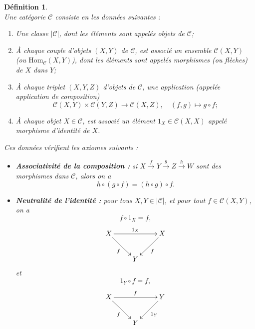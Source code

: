 \documentclass[a4paper, 14pt]{report}
\newtheorem{definition}{Définition}[section]
\begin{document}
\begin{onehalfspace}
{			\begin{definition} \cite{maclane1971categories} \\
				Une catégorie $\mathcal{C}$ consiste en les données suivantes :
				\begin{enumerate} [label=\roman*)]
					\item Une classe $|\mathcal{C}|$, dont les éléments sont appelés objets de $\mathcal{C}$;
					\item À chaque couple d'objets $(X, Y)$ de $\mathcal{C}$, est associé un ensemble $\mathcal{C}(X, Y)$ (ou $\mathrm{Hom}_{\mathcal{C}}(X, Y)$), dont les éléments sont appelés morphismes (ou flèches) de $X$ dans $Y$;
					\item À chaque triplet $(X, Y, Z)$ d'objets de $\mathcal{C}$, une application (appelée application de composition)
					\[
					\mathcal{C}(X, Y) \times \mathcal{C}(Y, Z) \to \mathcal{C}(X, Z), \quad (f, g) \mapsto g \circ f;
					\]
					\item À chaque objet $X \in \mathcal{C}$, est associé un élément $1_X \in \mathcal{C}(X, X)$ appelé morphisme d'identité de $X$.
				\end{enumerate}
				Ces données vérifient les axiomes suivants :
				\begin{itemize}
					\item \textbf{Associativité de la composition :}
					si $X \xrightarrow{f} Y \xrightarrow{g} Z \xrightarrow{h} W$ sont des morphismes dans $\mathcal{C}$, alors on a
					\[
					h \circ (g \circ f) = (h \circ g) \circ f.
					\]
					\item \textbf{Neutralité de l'identité :}
					pour tous $X, Y \in |\mathcal{C}|$, et pour tout $f \in \mathcal{C}(X, Y)$, on a
					\[
					f \circ 1_{X} = f,
					\]
					\[
					\xymatrix{
						X \ar[rr]^{1_{X}} \ar[dr]_{f} & & X \ar[dl]^{f} \\
						& Y &
					}
					\]
					et
					\[
					1_{Y} \circ f = f,
					\]
					\[
					\xymatrix{
						X \ar[rr]^{f} \ar[dr]_{f} & & Y \ar[dl]^{1_{Y}} \\
						& Y &
					}
					\]
				\end{itemize}
			\end{definition}
	
}
\end{onehalfspace}
\end{document}
